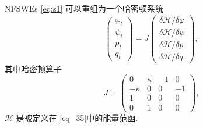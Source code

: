 \begin{theorem}\label{thm2}
NFSWEs \eqref{eq:s1} 可以重组为一个哈密顿系统
\begin{equation}\label{eq_37}
	\left(\begin{array}{l}
		\varphi_{t} \\
		\psi_{t} \\
		p_{t} \\
		q_{t}
		\end{array}\right)=J\left(\begin{array}{l}
		\delta \mathcal{H} / \delta \varphi \\
		\delta \mathcal{H} / \delta \psi \\
		\delta \mathcal{H} / \delta p \\
		\delta \mathcal{H} / \delta q
		\end{array}\right),
\end{equation}
其中哈密顿算子
\begin{equation}\label{eq_37b}
J=\left(\begin{array}{cccc}
		0 & \kappa & -1 & 0 \\
		-\kappa & 0 & 0 & -1 \\
		1 & 0 & 0 & 0 \\
		0 & 1 & 0 & 0
		\end{array}\right),
\end{equation}
 $\mathcal{H}$ 是被定义在 \eqref{eq_35}中的能量范函.
\end{theorem}

